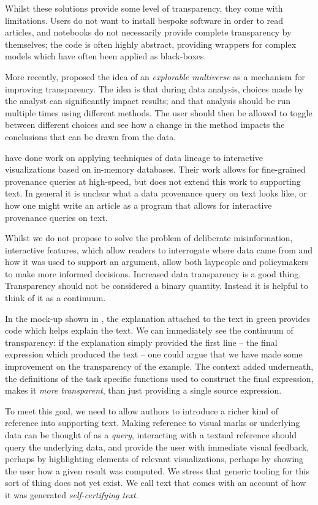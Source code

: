 Whilst these solutions provide some level of transparency, they come with limitations. Users do not want to
install bespoke software in order to read articles, and notebooks do not necessarily provide complete
transparency by themselves; the code is often highly abstract, providing wrappers for complex models which
have often been applied as black-boxes.

More recently, \citet{dragicevic19} proposed the idea of an \emph{explorable multiverse} as a mechanism for
improving transparency. The idea is that during data analysis, choices made by the analyst can significantly
impact results; and that analysis should be run multiple times using different methods. The user should then
be allowed to toggle between different choices and see how a change in the method impacts the conclusions that
can be drawn from the data.

\citet{psallidas18} have done work on applying techniques of data lineage to interactive visualizations based on
in-memory databases. Their work allows for fine-grained provenance queries at high-speed, but does not extend
this work to supporting text. In general it is unclear what a data provenance query on text looks like, or how
one might write an article as a program that allows for interactive provenance queries on text.

Whilst we do not propose to solve the problem of deliberate misinformation, interactive features, which allow
readers to interrogate where data came from and how it was used to support an argument, allow both laypeople
and policymakers to make more informed decisions. Increased data transparency is a good thing. Transparency
should not be considered a binary quantity. Instead it is helpful to think of it as a continuum.

In the mock-up shown in , the explanation attached to the text in green provides code
which helps explain the text. We can immediately see the continuum of transparency: if the explanation simply
provided the first line -- the final expression which produced the text -- one could argue that we have made
some improvement on the transparency of the example. The context added underneath, the definitions of the task
specific functions used to construct the final expression, makes it \emph{more transparent}, than just
providing a single source expression.

To meet this goal, we need to allow authors to introduce a richer kind of reference into supporting text.
Making reference to visual marks or underlying data can be thought of as a \emph{query}, interacting with a
textual reference should query the underlying data, and provide the user with immediate visual feedback,
perhaps by highlighting elements of relevant visualizations, perhaps by showing the user how a given result
was computed. We stress that generic tooling for this sort of thing does not yet exist. We call text that
comes with an account of how it was generated \emph{self-certifying text}.

